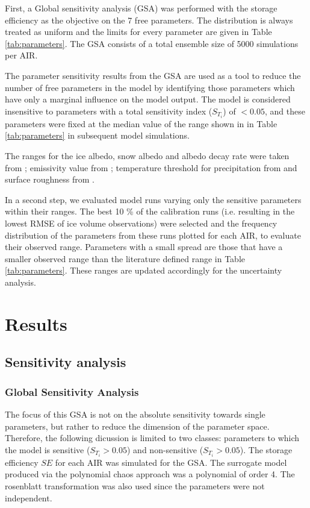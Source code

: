 \documentclass[utf8]{frontiersSCNS} %
\begin{document}
First, a Global sensitivity analysis (GSA) was performed with the storage efficiency as the objective on the 7 free
parameters. The distribution is always treated as uniform and the limits for every parameter are given in Table
\ref{tab:parameters}. The GSA consists of a total ensemble size of 5000 simulations per AIR.

The parameter sensitivity results from the GSA are used as a tool to reduce the number of free parameters in the model
by identifying those parameters which have only a marginal influence on the model output. The model is considered
insensitive to parameters with a total sensitivity index ($S_{T_{i}}$) of $< 0.05$, and these parameters were fixed at the
median value of the range shown in in Table \ref{tab:parameters} in subsequent model simulations.

The ranges for the ice albedo, snow albedo and albedo decay rate were taken from \cite{ZollesMaussion_2019}; emissivity
value from \cite{steiner_2015}; temperature threshold for precipitation from \cite{Zhou_2010} and surface roughness from
\cite{BrockWillisSharp_2006}.

In a second step, we evaluated model runs varying only the sensitive parameters within their ranges. The best 10 \% of
the calibration runs (i.e. resulting in the lowest RMSE of ice volume observations) were selected and the frequency
distribution of the parameters from these runs plotted for each AIR, to evaluate their observed range. Parameters with a
small spread are those that have a smaller observed range than the literature defined range in Table
\ref{tab:parameters}. These ranges are updated accordingly for the uncertainty analysis.

\section{Results}

\subsection{Sensitivity analysis}

\subsubsection{Global Sensitivity Analysis}

The focus of this GSA is not on the absolute sensitivity towards single parameters, but rather to reduce the dimension
of the parameter space. Therefore, the following dicussion is limited to two classes: parameters to which the model is
sensitive ($S_{T_{i}} > 0.05$) and non-sensitive ($S_{T_{i}} > 0.05$). The storage efficiency $SE$ for each AIR was
simulated for the GSA. The surrogate model produced via the polynomial chaos approach was a polynomial of order 4. The
rosenblatt transformation was also used since the parameters were not independent.
\end{document}
